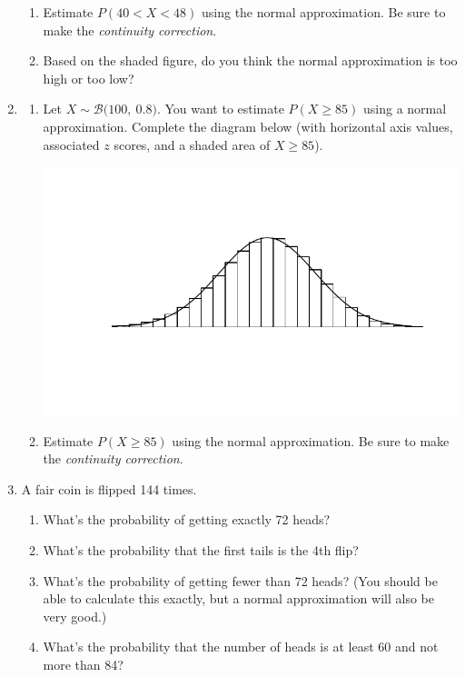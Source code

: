 \documentclass[12pt,letterpaper]{article}
\newcommand{\B}[2]{\mathcal{B}\big(#1,~#2\big)}
\begin{document}
\begin{enumerate}
\begin{enumerate}
\item Estimate $P(40 < X < 48)$ using the normal approximation. Be sure to make the \emph{continuity correction}.
\vfill
\item Based on the shaded figure, do you think the normal approximation is too high or too low?
\vfill
\end{enumerate}

\newpage

\item \begin{enumerate}
\item Let $X\sim \B{100}{0.8}$. You want to estimate $P(X \ge 85)$ using a normal approximation. Complete the diagram below (with horizontal axis values, associated $z$ scores, and a shaded area of $X \ge 85$).

\hspace{-100pt}
\includegraphics[scale=1.5]{nice_binos/overlay_100_0p8.pdf}

\item Estimate $P(X \ge 85)$ using the normal approximation. Be sure to make the \emph{continuity correction}.
\vfill
\end{enumerate}

\newpage

\item A fair coin is flipped 144 times.
\begin{enumerate}
\item What's the probability of getting exactly 72 heads?
\vfill
\item What's the probability that the first tails is the 4th flip?
\vfill
\item What's the probability of getting fewer than 72 heads? (You should be able to calculate this exactly, but a normal approximation will also be very good.)
\vfill
\item What's the probability that the number of heads is at least 60 and not more than 84?
\vfill
\end{enumerate}


\end{enumerate}
\end{document}
